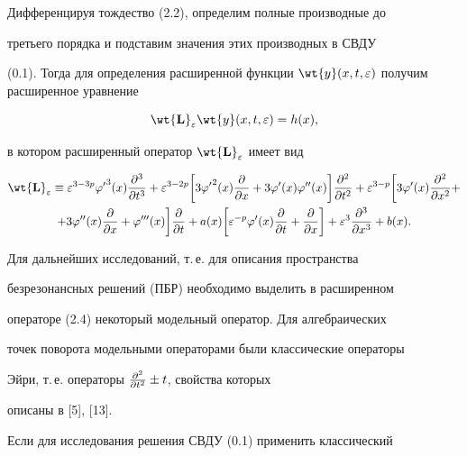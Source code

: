 Дифференцируя тождество (2.2), определим полные производные до


третьего порядка и подставим значения этих производных в СВДУ


(0.1). Тогда для определения расширенной функции $\wt{y} (x, t,


\e)$ получим расширенное уравнение


\begin{equation}


\wt{\bold{L}}_{\e} \wt{y} (x, t, \e) = h(x), 


\end{equation}


в котором расширенный оператор $\wt{\bold{L}}_{\e}$ имеет вид


\begin{multline}


\wt{\bold{L}}_{\e} \equiv \e^{3-3p} {\f'}^3 (x)


\frac{\d^3}{\d t^3} + \e^{3-2p} \bigg[3 {\f'}^2 (x) \frac{\d}{\d x} + 3


\f' (x) \f'' (x) \bigg] \frac{\d^2}{\d t^2} + \e^{3-p} \bigg[ 3 \f' (x)


\frac{\d^2}{\d x^2 } + \\


%


+ 3 \f'' (x) \frac{\d}{\d x} + \f''' (x) \bigg] \frac


{\d}{\d t} + a(x) \bigg[ \e^{-p} \f' (x) \frac{\d}{\d t} + \frac{\d}{\d


x} \bigg] + \e^3 \frac{\d^3}{\d x^3} + b(x).


\end{multline}





Для дальнейших исследований, т.\,е. для описания пространства


безрезонансных решений (ПБР) необходимо выделить в расширенном


операторе (2.4) некоторый модельный оператор. Для алгебраических


точек поворота модельными операторами были классические операторы


Эйри, т.\,е. операторы $\frac{\partial^2}{\partial t^2} \pm t$, свойства которых


описаны в [5], [13].





Если для исследования решения СВДУ (0.1) применить классический


